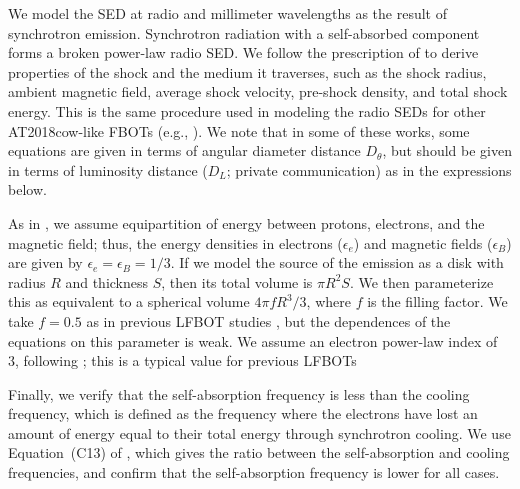 \documentclass[twocolumn,twocolappendix, linenumbers, trackchanges]{aastex7}
\begin{document}
We model the SED
at radio and millimeter wavelengths as the result of synchrotron emission.  Synchrotron radiation with a self-absorbed component forms a broken power-law radio SED. We follow the prescription of \citet{chevalier} to derive properties of the shock and the medium it traverses, such as the shock radius, ambient magnetic field, average shock velocity, pre-shock density, and total shock energy.  This is the same procedure used in modeling the radio SEDs for other AT2018cow-like FBOTs (e.g., \citealt{margutti,ho2019,chrimesfhn,nayana2025,Perley2026}). We note that in some of these works, some equations are given in terms of angular diameter distance $D_\theta$, but should be given in terms of luminosity distance ($D_L$; private communication) as in the expressions below. 

As in \citet{soderberg2010b}, we assume equipartition of energy between protons, electrons, and the magnetic field;  thus, the energy densities in electrons ($\epsilon_e$) and magnetic fields ($\epsilon_B$) are given by $\epsilon_e=\epsilon_B=1/3$.  If we model the source of the emission as a disk with radius $R$ and thickness $S$, then its total volume is $\pi R^2 S$.  We then parameterize this as equivalent to a spherical volume $4\pi f R^3/3$, where $f$ is the filling factor.  We take $f=0.5$ as in previous LFBOT studies \citep{yao2022, bright2022}, but the dependences of the equations on this parameter is weak. We assume an electron power-law index of 3, following \citet{chevalier2006}; this is a typical value for previous LFBOTs 

Finally, we verify that the self-absorption frequency is less than the cooling frequency, which is defined as the frequency where the electrons have lost an amount of energy equal to their total energy through synchrotron cooling. We use Equation~(C13) of \citet{ho2022xnd}, which gives the ratio between the self-absorption and cooling frequencies, and confirm that the self-absorption frequency is lower for all cases.
\end{document}
